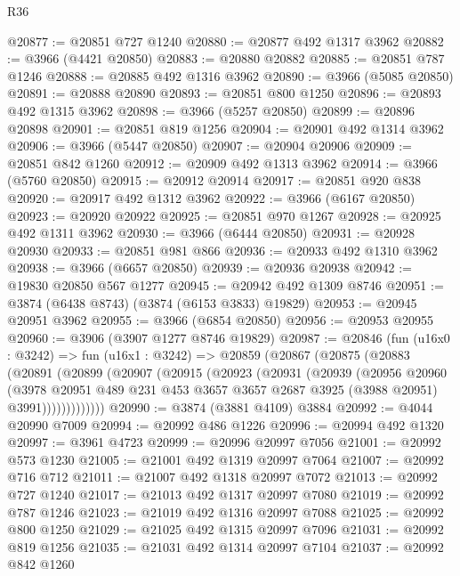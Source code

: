 \begin{lexlean}{R36}
\begin{coremodule}
@20877 := @20851 @727 @1240
@20880 := @20877 @492 @1317 @3962
@20882 := @3966 (@4421 @20850)
@20883 := @20880 @20882
@20885 := @20851 @787 @1246
@20888 := @20885 @492 @1316 @3962
@20890 := @3966 (@5085 @20850)
@20891 := @20888 @20890
@20893 := @20851 @800 @1250
@20896 := @20893 @492 @1315 @3962
@20898 := @3966 (@5257 @20850)
@20899 := @20896 @20898
@20901 := @20851 @819 @1256
@20904 := @20901 @492 @1314 @3962
@20906 := @3966 (@5447 @20850)
@20907 := @20904 @20906
@20909 := @20851 @842 @1260
@20912 := @20909 @492 @1313 @3962
@20914 := @3966 (@5760 @20850)
@20915 := @20912 @20914
@20917 := @20851 @920 @838
@20920 := @20917 @492 @1312 @3962
@20922 := @3966 (@6167 @20850)
@20923 := @20920 @20922
@20925 := @20851 @970 @1267
@20928 := @20925 @492 @1311 @3962
@20930 := @3966 (@6444 @20850)
@20931 := @20928 @20930
@20933 := @20851 @981 @866
@20936 := @20933 @492 @1310 @3962
@20938 := @3966 (@6657 @20850)
@20939 := @20936 @20938
@20942 := @19830 @20850 @567 @1277
@20945 := @20942 @492 @1309 @8746
@20951 := @3874 (@6438 @8743) (@3874 (@6153 @3833) @19829)
@20953 := @20945 @20951 @3962
@20955 := @3966 (@6854 @20850)
@20956 := @20953 @20955
@20960 := @3906 (@3907 @1277 @8746 @19829)
@20987 := @20846
    (fun (u16x0 : @3242) =>
    fun (u16x1 : @3242) =>
    @20859
      (@20867
        (@20875
          (@20883
            (@20891
              (@20899
                (@20907
                  (@20915
                    (@20923
                      (@20931
                        (@20939
                          (@20956
                            @20960
                            (@3978
                              @20951
                              @489
                              @231
                              @453
                              @3657
                              @3657
                              @2687
                              @3925
                              (@3988 @20951)
                              @3991)))))))))))))
@20990 := @3874 (@3881 @4109) @3884
@20992 := @4044 @20990 @7009
@20994 := @20992 @486 @1226
@20996 := @20994 @492 @1320
@20997 := @3961 @4723
@20999 := @20996 @20997 @7056
@21001 := @20992 @573 @1230
@21005 := @21001 @492 @1319 @20997 @7064
@21007 := @20992 @716 @712
@21011 := @21007 @492 @1318 @20997 @7072
@21013 := @20992 @727 @1240
@21017 := @21013 @492 @1317 @20997 @7080
@21019 := @20992 @787 @1246
@21023 := @21019 @492 @1316 @20997 @7088
@21025 := @20992 @800 @1250
@21029 := @21025 @492 @1315 @20997 @7096
@21031 := @20992 @819 @1256
@21035 := @21031 @492 @1314 @20997 @7104
@21037 := @20992 @842 @1260

\end{coremodule}
\end{lexlean}
